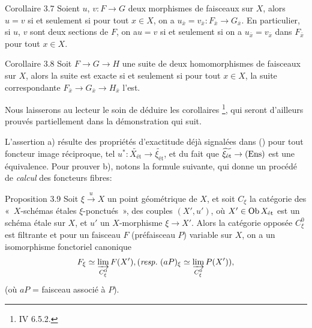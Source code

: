 \documentclass[10pt]{../fichiers-configuration-latex/smfart}
\begin{document}
\begin{enonce*}{Corollaire 3.7}
Soient $u$, $v : F \to G$ deux morphismes de faisceaux sur $X$, alors
$u = v$ si et seulement si pour tout $x \in X$, on a $u_{\bar{x}} =
v_{\bar{x}} : F_{\bar{x}} \to G_{\bar{x}}$. En particulier, si $u$,
$v$ sont deux sections de $F$, on a\pageoriginale  $u = v$ si et
seulement si on a
$u_{\bar{x}} = v_{\bar{x}}$ dans $F_{\bar{x}}$ pour tout $x \in X$.
\end{enonce*}

\begin{enonce*}{Corollaire 3.8}
Soit $F \to G \to H$ une suite de deux homomorphismes de faisceaux sur
$X$, alors la suite est exacte si et seulement si pour tout $x \in X$,
la suite correspondante $F_{\bar{x}} \to G_{\bar{x}} \to H_{\bar{x}}$
l'est.
\end{enonce*}

Nous laisserons au lecteur le soin de déduire les corollaires
\footnote{\Cf IV 6.5.2.}, %
qui seront d'ailleurs prouvés partiellement
dans la démonstration qui suit.

L'assertion a) résulte des propriétés d'exactitude déjà signalées
dans () pour tout foncteur image réciproque, tel
$u^{\ast} : \widetilde{X_{\text{ét}}} \to
\widetilde{\xi_{\text{ét}}}$, et du fait que
$\widetilde{\xi_{\text{ét}}} \to (\Ens)$ est une équivalence. Pour
prouver b), notons la formule suivante, qui donne un procédé de
\emph{calcul} des foncteurs fibres:

\begin{enonce*}{Proposition 3.9\footnotemark}
Soit $\xi \xrightarrow{u} X$ un point
géométrique de $X$, et soit $C_{\xi}$ la catégorie des « $X$-schémas étales $\xi$-ponctués », \ie des couples $(X', u')$, où
$X'\in \operatorname{Ob} X_{\text{\rm ét}}$ est un schéma étale sur $X$, et $u'$ un
$X$-morphisme $\xi \to X'$. Alors la catégorie opposée $C^{0}_{\xi}$
est filtrante et pour un faisceau $F$ (\resp préfaisceau $P$)
variable sur $X$, on a un isomorphisme fonctoriel canonique
$$
F_{\xi} \simeq \varinjlim_{C^{0}_{\xi}} F(X'), (\emph{resp.\kern.3em}
(aP)_{\xi} \simeq \varinjlim_{C^{0}_{\xi}} P(X')){},
$$
(où $aP$ = faisceau associé à $P$).
\end{enonce*}
\end{document}
